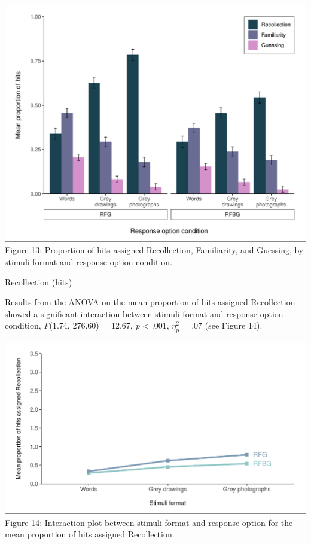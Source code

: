 \documentclass[
  11pt,
]{article}
\begin{document}
\includegraphics{R--Thesis_files/figure-latex/unnamed-chunk-43-1.pdf}
Figure 13: Proportion of hits assigned Recollection, Familiarity, and
Guessing, by stimuli format and response option condition.

Recollection (hits)

Results from the ANOVA on the mean proportion of hits assigned
Recollection showed a significant interaction between stimuli format and
response option condition, \emph{F}(1.74, 276.60) = 12.67, \emph{p}
\textless{} .001, \(\eta^2_p\) = .07 (see Figure 14).

\includegraphics{R--Thesis_files/figure-latex/unnamed-chunk-45-1.pdf}
Figure 14: Interaction plot between stimuli format and response option
for the mean proportion of hits assigned Recollection. ~~
\end{document}
